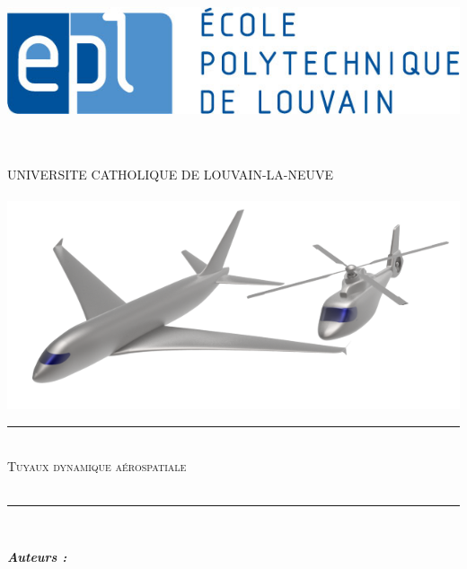 \begin{titlepage}

\newcommand{\HRule}{\rule{\linewidth}{0.5mm}} %

\center %

\begin{minipage}{0.2\textwidth}
\begin{flushleft} \large
\includegraphics[scale=0.3]{epl-logo.jpg}
\end{flushleft}
\end{minipage}
\begin{minipage}{0.6\textwidth}
\begin{flushright} \large
\end{flushright}
\end{minipage}\\[0.2cm]
\\
[0.5cm]
{\Large UNIVERSITE CATHOLIQUE DE LOUVAIN-LA-NEUVE}\\[0.1Cm]
\\
[0.7cm]
\includegraphics[scale=0.8]{1.png}
\\[1.5cm]
\HRule \\[0.3cm]
{ \huge \textsc{Tuyaux dynamique aérospatiale\\ }}\\[0.25cm] %
\HRule \\[3cm]
 
\begin{minipage}{0.4\textwidth}
\begin{flushleft} \large
\emph{\textbf{Auteurs :}}\\


\end{flushleft}
\end{minipage}
\end{titlepage}
